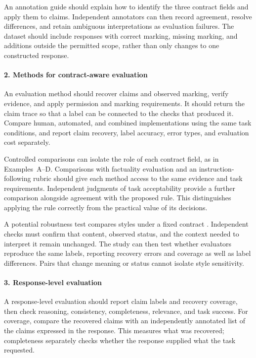 \documentclass{clv2025}
\begin{document}
An annotation guide should explain how to identify the three contract fields
and apply them to claims. Independent annotators can then record agreement,
resolve differences, and retain ambiguous interpretations as evaluation
failures. The dataset should include responses with correct marking, missing
marking, and additions outside the permitted scope, rather than only changes
to one constructed response.

\paragraph{2. Methods for contract-aware evaluation}
An evaluation method should recover claims and observed marking, verify
evidence, and apply permission and marking requirements. It should return
the claim trace so that a label can be connected to the checks that produced
it. Compare human, automated, and combined implementations using the same
task conditions, and report claim recovery, label accuracy, error types,
and evaluation cost separately.

Controlled comparisons can isolate the role of each contract field, as in
Examples~A--D. Comparisons with factuality evaluation and an instruction-following rubric
should give each method access to the same evidence and task requirements. Independent
judgments of task acceptability provide a further comparison alongside
agreement with the proposed rule. This distinguishes applying the rule
correctly from the practical value of its decisions.

A potential robustness test compares styles under a fixed contract
\citep{rao_dear_2018,briakou_evaluating_2021,feuer_style_2025,lyu_converge_2026}.
Independent checks must confirm that content, observed status, and the
context needed to interpret it remain unchanged. The study can then test
whether evaluators reproduce the same labels, reporting recovery errors
and coverage as well as label differences. Pairs that change meaning or
status cannot isolate style sensitivity.

\paragraph{3. Response-level evaluation}
A response-level evaluation should report claim labels and recovery coverage,
then check reasoning, consistency, completeness, relevance, and task success.
For coverage, compare the recovered claims with an independently annotated
list of the claims expressed in the response. This measures what was recovered;
completeness separately checks whether the response supplied what the task
requested.
\end{document}

